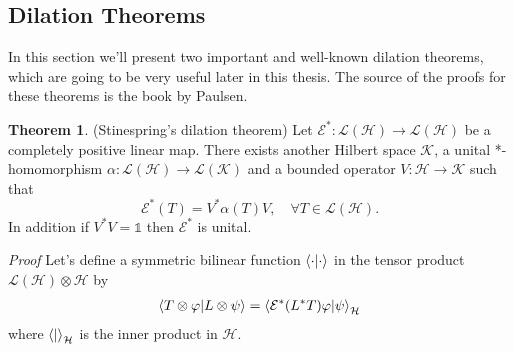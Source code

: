 \documentclass[a4paper,12pt]{wihuri}
\theoremstyle{definition}
\newtheorem{theorem}{Theorem}
\numberwithin{definition}{section}
\numberwithin{example}{section}
\numberwithin{theorem}{section}
\numberwithin{proposition}{section}
\numberwithin{lemma}{section}
\newcommand{\hi}{\mathcal{H}}%
\newcommand{\ki}{\mathcal{K}}%
\newcommand{\lin}{\mathcal{L}}%
\newcommand{\EC}{\mathcal{E}}
\newcommand{\id}{\mathds{1}}
\begin{document}
\subsection{Dilation Theorems}
In this section we'll present two important and well-known dilation theorems, which are going to be very useful later in this thesis. The source of the proofs for these theorems is the book by Paulsen\cite{paulsen_vern}.

\begin{theorem}(Stinespring's dilation theorem)
Let $\EC^*: \lin(\hi) \rightarrow \lin(\hi)$ be a completely positive linear map. There exists another Hilbert space $\ki$, a unital *-homomorphism $\alpha : \lin(\hi) \rightarrow \lin(\ki)$ and a bounded operator $V: \hi \rightarrow \ki$ such that
\begin{equation}
\EC^*(T) = V^*\alpha(T)V, \quad \forall T \in \lin(\hi)\text{.}
\end{equation}
In addition if $V^*V = \id$ then $\EC^*$ is unital.
\end{theorem}
\noindent \textit{Proof} Let's define a symmetric bilinear function $\braket{\cdot|\cdot}$ in the tensor product $\lin(\hi) \otimes \hi$ by
\begin{align*}
\braket{T\otimes \varphi|L \otimes \psi} = \braket{\EC^*(L^*T)\varphi|\psi}_{\hi} 
\end{align*}
where $\braket{|}_{\hi}$ is the inner product in $\hi$. 
\end{document}
